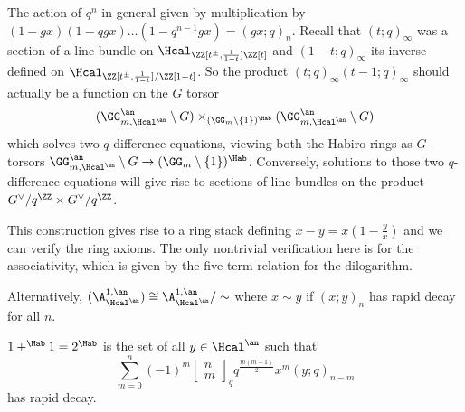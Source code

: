 The action of $q^{n}$ in general given by multiplication by $(1-gx)(1-qgx)\dots(1-q^{n-1}gx)=(gx;q)_{n}$. Recall that $(t;q)_{\infty}$ was a section of a line bundle on $\Hcal_{\ZZ[t^{\pm},\frac{1}{1-t}]\ZZ[t]}$ and $(1-t;q)_{\infty}$ its inverse defined on $\Hcal_{\ZZ[t^{\pm},\frac{1}{1-t}]/\ZZ[1-t]}$. So the product $(t;q)_{\infty}(t-1;q)_{\infty}$ should actually be a function on the $G$ torsor $$(\GG_{m,\Hcal^{\an}}^{\an}\setminus G)\times_{(\GG_{m}\setminus\{1\})^{\Hab}} (\GG_{m,\Hcal^{\an}}^{\an}\setminus G)$$ which solves two $q$-difference equations, viewing both the Habiro rings as $G$-torsors $\GG_{m,\Hcal^{\an}}^{\an}\setminus G\to (\GG_{m}\setminus\{1\})^{\Hab}$. Conversely, solutions to those two $q$-difference equations will give rise to sections of line bundles on the product $G^{\vee}/q^{\ZZ}\times G^{\vee}/q^{\ZZ}$. 

This construction gives rise to a ring stack defining $x-y=x(1-\frac{y}{x})$ and we can verify the ring axioms. The only nontrivial verification here is for the associativity, which is given by the five-term relation for the dilogarithm. 
\begin{remark}
    Alternatively, $(\A^{1,\an}_{\Hcal^{\an}})\cong\A^{1,\an}_{\Hcal^{\an}}/\sim$ where $x\sim y$ if $(x;y)_{n}$ has rapid decay for all $n$. 
\end{remark}
\begin{example}
    $1+^{\Hab}1=2^{\Hab}$ is the set of all $y\in\Hcal^{\an}$ such that
    $$\sum_{m=0}^{n}(-1)^{m}\begin{bmatrix}
        n \\ m
    \end{bmatrix}_{q}q^{\frac{m(m-1)}{2}}x^{m}(y;q)_{n-m}$$
    has rapid decay.
\end{example}
